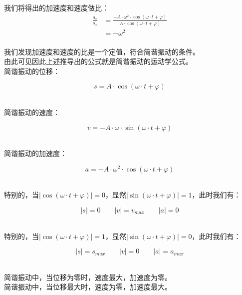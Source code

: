 \documentclass[UTF8]{ctexart}
\begin{document}
\newpage

    我们将得出的加速度和速度做比：\vspace{5pt}
    \begin{align}
        \frac{a_x}{s_x}
        &=\frac{-A\cdot\omega^2\cdot\cos{(\omega\cdot t+\varphi)}}{A\cdot \cos{\left(\omega\cdot t+\varphi\right)}}\\[2mm]
        &=-\omega^2
    \end{align}\\
    我们发现加速度和速度的比是一个定值，符合简谐振动的条件。\\[3mm]
    由此可见因此上述推导出的公式就是简谐振动的运动学公式。\\[5mm]
    简谐振动的位移：
    \begin{large}
        \begin{equation*}
            s=A\cdot \cos{\left(\omega\cdot t+\varphi\right)}
        \end{equation*}
    \end{large}\\
    简谐振动的速度：
    \begin{large}
        \begin{equation*}
            v=-A\cdot\omega\cdot\sin{(\omega\cdot t+\varphi)}
        \end{equation*}
    \end{large}\\
    简谐振动的加速度：
    \begin{large}
        \begin{equation*}
            a=-A\cdot\omega^2\cdot\cos{(\omega\cdot t+\varphi)}
        \end{equation*}
    \end{large}\\[2mm]
    特别的，当$\big|\cos{(\omega\cdot t+\varphi)}\big|=0$，显然$\big|\sin{(\omega\cdot t+\varphi)}\big|=1$，此时我们有：
    \begin{large}
        \begin{equation*}
            |s|=0\qquad |v|=v_{max}\qquad |a|=0
        \end{equation*}
    \end{large}\\
    特别的，当$\big|\cos{(\omega\cdot t+\varphi)}\big|=1$，显然$\big|\sin{(\omega\cdot t+\varphi)}\big|=0$，此时我们有：
    \begin{large}
        \begin{equation*}
            |s|=s_{max}\qquad |v|=0\qquad |a|=a_{max}
        \end{equation*}
    \end{large}\\
    简谐振动中，当位移为零时，速度最大，加速度为零。\\[3mm]
    简谐振动中，当位移最大时，速度为零，加速度最大。\\[3mm]
\end{document}
